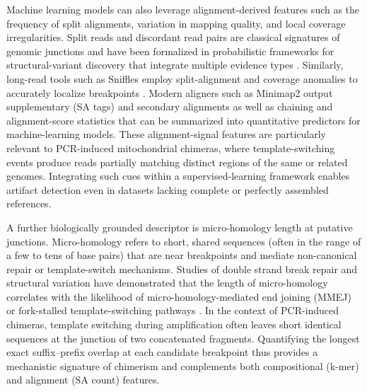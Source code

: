 Machine learning models can also leverage alignment-derived features such as the frequency of split alignments, variation in mapping quality, and local coverage irregularities. Split reads and discordant read pairs are classical signatures of genomic junctions and have been formalized in probabilistic frameworks for structural-variant discovery that integrate multiple evidence types \citep{Layer2014}. Similarly, long-read tools such as Sniffles employ split-alignment and coverage anomalies to accurately localize breakpoints \citep{Sedlazeck2018}. Modern aligners such as Minimap2 \citep{Li2018} output supplementary (SA tags) and secondary alignments as well as chaining and alignment-score statistics that can be summarized into quantitative predictors for machine-learning models. These alignment-signal features are particularly relevant to PCR-induced mitochondrial chimeras, where template-switching events produce reads partially matching distinct regions of the same or related genomes. Integrating such cues within a supervised-learning framework enables artifact detection even in datasets lacking complete or perfectly assembled references.

A further biologically grounded descriptor is micro-homology length at putative junctions. Micro-homology refers to short, shared sequences (often in the range of a few to tens of base pairs) that are near breakpoints and mediate non-canonical repair or template-switch mechanisms. Studies of double strand break repair and structural variation have demonstrated that the length of micro-homology correlates with the likelihood of micro-homology-mediated end joining (MMEJ) or fork-stalled template-switching pathways \citep{Sfeir2015}. In the context of PCR-induced chimeras, template switching during amplification often leaves short identical sequences at the junction of two concatenated fragments. Quantifying the longest exact suffix–prefix overlap at each candidate breakpoint thus provides a mechanistic signature of chimerism and complements both compositional (k-mer) and alignment (SA count) features.
